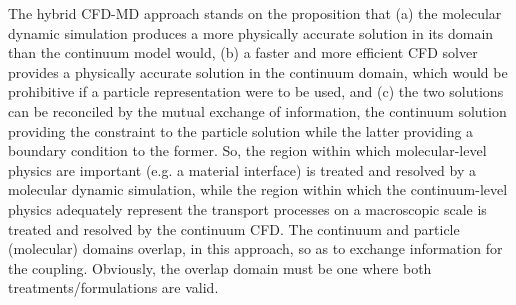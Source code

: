\documentclass[preprint,12pt]{elsarticle}
\newcommand{\Nkimnote}[1]{ {\textcolor{blue} { ***NKim: #1 }}}
\newcommand{\Nkimnote}[1]{}
\begin{document}

The hybrid CFD-MD approach stands on the proposition that (a) the molecular dynamic simulation produces a more physically accurate solution in its domain than the continuum model would, (b) a faster and more efficient CFD solver provides a physically accurate solution in the continuum domain, which would be prohibitive if a particle representation were to be used, and (c) the two solutions can be reconciled by the mutual exchange of information, the continuum solution providing the constraint to the particle solution while the latter providing a boundary condition to the former. So, the region within which molecular-level physics are important (e.g. a material interface) is treated and resolved by a molecular dynamic simulation, while the region within which the continuum-level physics adequately represent the transport processes on a macroscopic scale is treated and resolved by the continuum CFD. The continuum and particle (molecular) domains overlap, in this approach, so as to exchange information for the coupling. Obviously, the overlap domain must be one where both treatments/formulations are valid.
\end{document}

